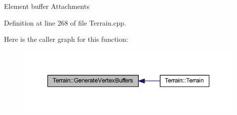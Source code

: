 Element buffer Attachments 

Definition at line 268 of file Terrain.\+cpp.



Here is the caller graph for this function\+:
\nopagebreak
\begin{figure}[H]
\begin{center}
\leavevmode
\includegraphics[width=347pt]{class_terrain_a7e77d9afe77e6dd620bf75b5fe78d2e5_icgraph}
\end{center}
\end{figure}



